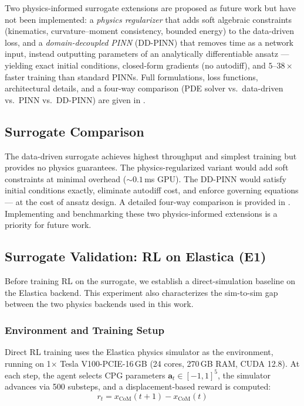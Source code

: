 \documentclass[11pt]{article}
\begin{document}
Two physics-informed surrogate extensions are proposed as future work but have not been implemented: a \emph{physics regularizer} that adds soft algebraic constraints (kinematics, curvature--moment consistency, bounded energy) to the data-driven loss, and a \emph{domain-decoupled PINN} (DD-PINN) \citep{Krauss2024,Licher2025} that removes time as a network input, instead outputting parameters of an analytically differentiable ansatz --- yielding exact initial conditions, closed-form gradients (no autodiff), and $5$--$38\times$ faster training than standard PINNs.
Full formulations, loss functions, architectural details, and a four-way comparison (PDE solver vs.\ data-driven vs.\ PINN vs.\ DD-PINN) are given in .

\subsection{Surrogate Comparison}
\label{sec:pinn:results}

The data-driven surrogate achieves highest throughput and simplest training but provides no physics guarantees.
The physics-regularized variant would add soft constraints at minimal overhead (${\sim}0.1$\,ms GPU).
The DD-PINN would satisfy initial conditions exactly, eliminate autodiff cost, and enforce governing equations --- at the cost of ansatz design.
A detailed four-way comparison is provided in .
Implementing and benchmarking these two physics-informed extensions is a priority for future work.

\subsection{Surrogate Validation: RL on Elastica (E1)}
\label{sec:rl-elastica}

Before training RL on the surrogate, we establish a direct-simulation baseline on the Elastica backend.
This experiment also characterizes the sim-to-sim gap between the two physics backends used in this work.

\subsubsection{Environment and Training Setup}
\label{sec:rl-elastica:setup}

Direct RL training uses the Elastica physics simulator as the environment, running on 1$\times$ Tesla V100-PCIE-16\,GB (24 cores, 270\,GB RAM, CUDA 12.8).
At each step, the agent selects CPG parameters $\mathbf{a}_t \in [-1,1]^5$, the simulator advances via 500 substeps, and a displacement-based reward is computed:
\begin{equation}
  r_t = x_{\text{CoM}}(t+1) - x_{\text{CoM}}(t)
  \label{eq:reward}
\end{equation}
\end{document}
